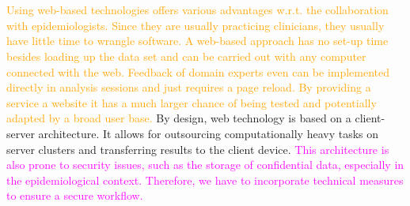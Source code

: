 \documentclass[journal]{style/vgtc} 			          %
\newcommand{\design}[1]{\textcolor{orange}{#1}}
\newcommand{\magenta}[1]{\textcolor{magenta}{#1}}
\begin{document}
\\\\
\design{
Using web-based technologies offers various advantages w.r.t. the collaboration with epidemiologists.
Since they are usually practicing clinicians, they usually have little time to wrangle software.
A web-based approach has no set-up time besides loading up the data set and can be carried out with any computer connected with the web.
Feedback of domain experts even can be implemented directly in analysis sessions and just requires a page reload.
By providing a service a website it has a much larger chance of being tested and potentially adapted by a broad user base.
}
By design, web technology is based on a client-server architecture.
It allows for outsourcing computationally heavy tasks on server clusters and transferring results to the client device.
\magenta{
This architecture is also prone to security issues, such as the storage of confidential data, especially in the epidemiological context.
Therefore, we have to incorporate technical measures to ensure a secure workflow.
}
\end{document}
